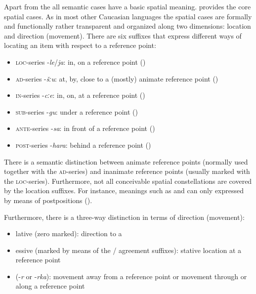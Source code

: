 Apart from the  all semantic cases have a basic spatial meaning.  provides the core spatial cases. As in most other Caucasian languages the spatial cases are formally and functionally rather transparent and organized along two dimensions: location and direction (movement). There are six suffixes that express different ways of locating an item with respect to a reference point: 
%
\begin{itemize}
	\item \textsc{loc}-series -\textit{le}\slash\textit{ja}: in, on a reference point ()
	\item \textsc{ad}-series -\textit{šːu}: at, by, close to a (mostly) animate reference point ()
	\item \textsc{in}-series -\textit{cːe}: in, on, at a reference point ()
	\item \textsc{sub}-series -\textit{gu}: under a reference point ()
	\item \textsc{ante}-series -\textit{sa}: in front of a reference point ()
	\item \textsc{post}-series -\textit{hara}: behind a reference point ()
\end{itemize}


There is a semantic distinction between animate reference points (normally used together with the \textsc{ad}-series) and inanimate reference points (usually marked with the \textsc{loc}-series). Furthermore, not all conceivable spatial constellations are covered by the location suffixes. For instance, meanings such as  and  can only expressed by means of postpositions ().

Furthermore, there is a three-way distinction in terms of direction (movement):
%
\begin{itemize}
	\item lative (zero marked): direction to a 
	\item essive (marked by means of the / agreement suffixes): stative location at a reference point
	\item {} (-\textit{r} or -\textit{rka}): movement away from a reference point or movement through or along a reference point
\end{itemize}

